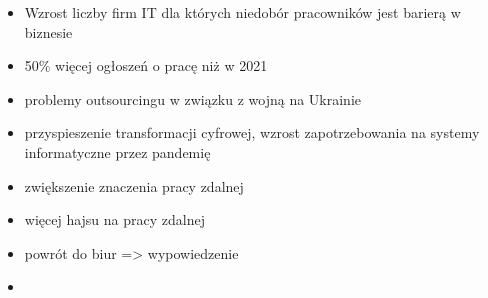 \begin{itemize}
    \item Wzrost liczby firm IT dla których niedobór pracowników jest barierą w biznesie \cite{https://www.rp.pl/rynek-pracy/art35856021-wojna-nasili-niedobor-kadr-w-it-naplyw-nowych-zlecen-do-polski}
    \item 50\% więcej ogłoszeń o pracę niż w 2021\cite{https://www.rp.pl/rynek-pracy/art35856021-wojna-nasili-niedobor-kadr-w-it-naplyw-nowych-zlecen-do-polski}
    \item problemy outsourcingu w związku z wojną na Ukrainie \cite{https://www.computerworld.pl/news/Wojna-w-Ukrainie-stawia-globalny-outsourcing-IT-w-trudnej-sytuacji,437151.html}
    \item przyspieszenie transformacji cyfrowej,  wzrost zapotrzebowania na systemy informatyczne przez pandemię \cite{https://itwiz.pl/sytuacja-na-rynku-pracy-it-w-dobie-koronawirusa/}
    \item zwiększenie znaczenia pracy zdalnej \cite{https://antyweb.pl/praca-zdalna-w-it}
    \item więcej hajsu na pracy zdalnej \cite{https://cyberdefence24.pl/biznes-i-finanse/polscy-pracodawcy-nie-chca-pracy-zdalnej-branza-it-zachowuje-elastycznosc}
    \item powrót do biur => wypowiedzenie \cite{https://geek.justjoin.it/przymusowy-powrot-do-biura-z-home-office-w-branzy-it-64-proc-wrociloby-z-wypowiedzeniem}
    \item
    \end{itemize}

